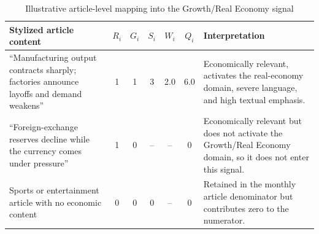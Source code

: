 \begin{table}[htbp]
\centering\scriptsize
\caption{Illustrative article-level mapping into the Growth/Real Economy signal}
\label{tab:worked_example}
\begin{tabularx}{\textwidth}{p{}cccccX}
\toprule
Stylized article content & $R_i$ & $G_i$ & $S_i$ & $W_i$ & $Q_i$ & Interpretation \\
\midrule
``Manufacturing output contracts sharply; factories announce layoffs and demand weakens'' & 1 & 1 & 3 & 2.0 & 6.0 & Economically relevant, activates the real-economy domain, severe language, and high textual emphasis. \\
``Foreign-exchange reserves decline while the currency comes under pressure'' & 1 & 0 & -- & -- & 0 & Economically relevant but does not activate the Growth/Real Economy domain, so it does not enter this signal. \\
Sports or entertainment article with no economic content & 0 & 0 & 0 & -- & 0 & Retained in the monthly article denominator but contributes zero to the numerator. \\
\bottomrule
\end{tabularx}
\vspace{0.3em}
\end{table}
